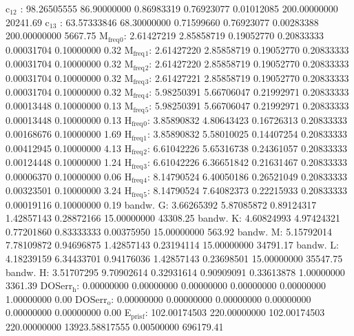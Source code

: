 \documentclass[11pt]{article}
\begin{document}
 c\(_{\text{12}}\)    :  98.26505555  86.90000000   0.86983319   0.76923077   0.01012085 200.00000000     20241.69
 c\(_{\text{13}}\)    :  63.57333846  68.30000000   0.71599660   0.76923077   0.00283388 200.00000000      5667.75
 M\(_{\text{freq}}\)\(_{\text{0}}\):   2.61427219   2.85858719   0.19052770   0.20833333   0.00031704   0.10000000         0.32
 M\(_{\text{freq}}\)\(_{\text{1}}\):   2.61427220   2.85858719   0.19052770   0.20833333   0.00031704   0.10000000         0.32
 M\(_{\text{freq}}\)\(_{\text{2}}\):   2.61427220   2.85858719   0.19052770   0.20833333   0.00031704   0.10000000         0.32
 M\(_{\text{freq}}\)\(_{\text{3}}\):   2.61427221   2.85858719   0.19052770   0.20833333   0.00031704   0.10000000         0.32
 M\(_{\text{freq}}\)\(_{\text{4}}\):   5.98250391   5.66706047   0.21992971   0.20833333   0.00013448   0.10000000         0.13
 M\(_{\text{freq}}\)\(_{\text{5}}\):   5.98250391   5.66706047   0.21992971   0.20833333   0.00013448   0.10000000         0.13
 H\(_{\text{freq}}\)\(_{\text{0}}\):   3.85890832   4.80643423   0.16726313   0.20833333   0.00168676   0.10000000         1.69
 H\(_{\text{freq}}\)\(_{\text{1}}\):   3.85890832   5.58010025   0.14407254   0.20833333   0.00412945   0.10000000         4.13
 H\(_{\text{freq}}\)\(_{\text{2}}\):   6.61042226   5.65316738   0.24361057   0.20833333   0.00124448   0.10000000         1.24
 H\(_{\text{freq}}\)\(_{\text{3}}\):   6.61042226   6.36651842   0.21631467   0.20833333   0.00006370   0.10000000         0.06
 H\(_{\text{freq}}\)\(_{\text{4}}\):   8.14790524   6.40050186   0.26521049   0.20833333   0.00323501   0.10000000         3.24
 H\(_{\text{freq}}\)\(_{\text{5}}\):   8.14790524   7.64082373   0.22215933   0.20833333   0.00019116   0.10000000         0.19
 bandw. G:   3.66265392   5.87085872   0.89124317   1.42857143   0.28872166  15.00000000     43308.25
 bandw. K:   4.60824993   4.97424321   0.77201860   0.83333333   0.00375950  15.00000000       563.92
 bandw. M:   5.15792014   7.78109872   0.94696875   1.42857143   0.23194114  15.00000000     34791.17
 bandw. L:   4.18239159   6.34433701   0.94176036   1.42857143   0.23698501  15.00000000     35547.75
 bandw. H:   3.51707295   9.70902614   0.32931614   0.90909091   0.33613878   1.00000000      3361.39
 DOSerr\(_{\text{h}}\):   0.00000000   0.00000000   0.00000000   0.00000000   0.00000000   1.00000000         0.00
 DOSerr\(_{\text{o}}\):   0.00000000   0.00000000   0.00000000   0.00000000   0.00000000   0.00000000         0.00
 E\(_{\text{pris}}\)\(_{\text{f}}\): 102.00174503 220.00000000 102.00174503 220.00000000 13923.58817555   0.00500000    696179.41
\end{document}

